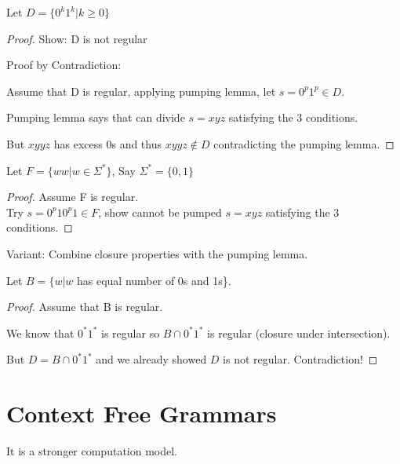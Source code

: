 \begin{eg}
    Let \(D = \{ 0^k1^k | k \geq 0 \} \) 
\end{eg}
\begin{proof}
    Show: D is not regular

    Proof by Contradiction:

    Assume that D is regular, applying pumping lemma, let \(s = 0^p1^p \in D\). 

    Pumping lemma says that can divide \(s = xyz\) satisfying the 3 conditions.

    But \(xyyz\) has excess 0s and thus \(xyyz \notin D\) contradicting the pumping lemma.  
\end{proof}

\begin{eg}
    Let \(F = \{ ww| w \in \Sigma^* \} \), Say \(\Sigma^* = \{ 0, 1 \} \)  
\end{eg}
\begin{proof}
    Assume F is regular.\\
    Try \(s = 0^p10^p1 \in F\), show cannot be pumped \(s = xyz\) satisfying the 3 conditions.  
\end{proof}

Variant: Combine closure properties with the pumping lemma.

\begin{eg}
    Let \(B = \{ w | w \)  has equal number of 0s and 1s\}.
\end{eg}
\begin{proof}
    Assume that B is regular.

    We know that \(0^*1^*\) is regular so  \(B \cap 0^*1^*\) is regular (closure under intersection). 

    But \(D = B \cap 0^*1^*\) and we already showed \(D\) is not regular. Contradiction!
\end{proof}


\section{Context Free Grammars}

It is a stronger computation model.
